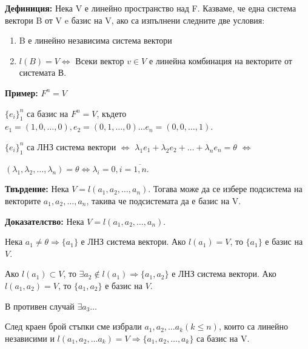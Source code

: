 \documentclass[fleqn,12pt]{article}
\begin{document}
\begin{flushleft}
    \textbf{Дефиниция:} Нека V е линейно пространство над F. Казваме, че една система вектори B от V e базис на V, ако са изпълнени следните две условия:

    \begin{enumerate}
        \item B е линейно независима система вектори
        \item $l(B) = V \Leftrightarrow $ Всеки вектор $ v \in V $ е линейна комбинация на векторите от системата В.
    \end{enumerate}

\textbf{Пример:} $ F^n = V $

$\{ e_i\}_1^n $ са базис на $ F^n = V $, където $ e_1 = (1, 0, \dots, 0), e_2 = (0, 1, \dots, 0) \dots e_n = (0, 0, \dots, 1)$.

$ \{ e_i\}_1^n $ са ЛНЗ система вектори $\iff$ $ \lambda_1 e_1 + \lambda_2 e_2 + \dots + \lambda_n e_n = \theta $ $\iff$

$ (\lambda_1, \lambda_2, \dots, \lambda_n) = \theta \Leftrightarrow \lambda_i = 0, i = \overline{1,n}$.

    
    \vspace{5mm}

    \textbf{Твърдение:} Нека $ V = l(a_1, a_2, \dots, a_n) $. Тогава може да се избере подсистема на векторите $ a_1, a_2, \dots, a_n $, такива че подсистемата да е базис на V.

    \vspace{5mm}
    
        \textbf{Доказателство:}
        Нека $ V = l(a_1, a_2, \dots, a_n) $.

        Нека $ a_1 \neq \theta \Rightarrow \{a_1\}$ е ЛНЗ система вектори.
        Ако $ l(a_1) = V$, то $\{a_1\}$ е базис на $V$.

        \vspace{4mm}

        Ако $l(a_1) \subset V$, то $\exists a_2 \notin l(a_1) \Rightarrow \{a_1, a_2\}$ е ЛНЗ система вектори.
        Ако $ l(a_1, a_2) = V$, то $\{a_1, a_2\}$ е базис на $V$.

        \vspace{4mm}

        В противен случай $\exists a_3 \dots$

        След краен брой стъпки сме избрали $a_1, a_2, \dots a_k (k \leq n) $, които са линейно независими и $l(a_1, a_2, \dots a_k) = V \Rightarrow \{a_1, a_2, \dots, a_k\}$ са базис на V. \square
    

\end{flushleft}
\end{document}
